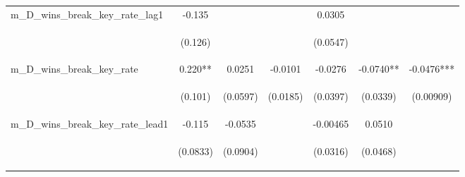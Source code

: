 \begin{tabular}{lcccccc}
m\_D\_wins\_break\_key\_rate\_lag1 & -0.135 &  &  & 0.0305 &  &  \\
\vspace{4pt} & \begin{footnotesize}(0.126)\end{footnotesize} & \begin{footnotesize}\end{footnotesize} & \begin{footnotesize}\end{footnotesize} & \begin{footnotesize}(0.0547)\end{footnotesize} & \begin{footnotesize}\end{footnotesize} & \begin{footnotesize}\end{footnotesize} \\
m\_D\_wins\_break\_key\_rate & 0.220** & 0.0251 & -0.0101 & -0.0276 & -0.0740** & -0.0476*** \\
\vspace{4pt} & \begin{footnotesize}(0.101)\end{footnotesize} & \begin{footnotesize}(0.0597)\end{footnotesize} & \begin{footnotesize}(0.0185)\end{footnotesize} & \begin{footnotesize}(0.0397)\end{footnotesize} & \begin{footnotesize}(0.0339)\end{footnotesize} & \begin{footnotesize}(0.00909)\end{footnotesize} \\
m\_D\_wins\_break\_key\_rate\_lead1 & -0.115 & -0.0535 &  & -0.00465 & 0.0510 &  \\
\vspace{4pt} & \begin{footnotesize}(0.0833)\end{footnotesize} & \begin{footnotesize}(0.0904)\end{footnotesize} & \begin{footnotesize}\end{footnotesize} & \begin{footnotesize}(0.0316)\end{footnotesize} & \begin{footnotesize}(0.0468)\end{footnotesize} & \begin{footnotesize}\end{footnotesize} \\

\end{tabular}
